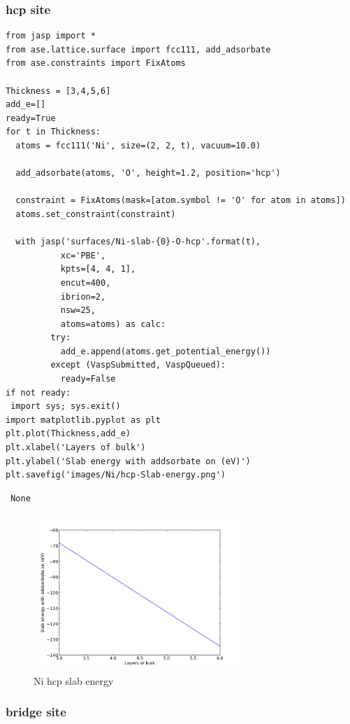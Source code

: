 \documentclass[11pt]{article}
\begin{document}
\subsubsection{hcp site}
\label{sec-3-4-2}


\begin{verbatim}
from jasp import *
from ase.lattice.surface import fcc111, add_adsorbate
from ase.constraints import FixAtoms

Thickness = [3,4,5,6]
add_e=[]
ready=True
for t in Thickness:
  atoms = fcc111('Ni', size=(2, 2, t), vacuum=10.0)

  add_adsorbate(atoms, 'O', height=1.2, position='hcp')

  constraint = FixAtoms(mask=[atom.symbol != 'O' for atom in atoms])
  atoms.set_constraint(constraint)

  with jasp('surfaces/Ni-slab-{0}-O-hcp'.format(t),
           xc='PBE',
           kpts=[4, 4, 1],
           encut=400,
           ibrion=2,
           nsw=25,
           atoms=atoms) as calc:
         try:
           add_e.append(atoms.get_potential_energy())
         except (VaspSubmitted, VaspQueued):
           ready=False
if not ready:
 import sys; sys.exit()
import matplotlib.pyplot as plt
plt.plot(Thickness,add_e)
plt.xlabel('Layers of bulk')
plt.ylabel('Slab energy with addsorbate on (eV)')
plt.savefig('images/Ni/hcp-Slab-energy.png')
\end{verbatim}

\begin{verbatim}
 None
\end{verbatim}
\begin{figure}[H]
\centering
\includegraphics[width=0.7\textwidth]{./images/Ni/hcp-Slab-energy.png}
\caption{Ni hcp slab energy}
\end{figure}
\subsubsection{bridge site}
\label{sec-3-4-3}
\end{document}
